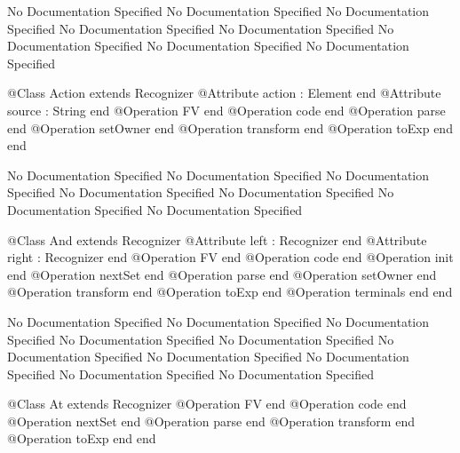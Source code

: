 No Documentation Specified
No Documentation Specified
No Documentation Specified
No Documentation Specified
No Documentation Specified
No Documentation Specified
No Documentation Specified
No Documentation Specified
\begin{Interface}
@Class Action extends Recognizer
  @Attribute action : Element end
  @Attribute source : String end
  @Operation FV end
  @Operation code end
  @Operation parse end
  @Operation setOwner end
  @Operation transform end
  @Operation toExp end
end
\end{Interface}
No Documentation Specified
No Documentation Specified
No Documentation Specified
No Documentation Specified
No Documentation Specified
No Documentation Specified
No Documentation Specified
\begin{Interface}
@Class And extends Recognizer
  @Attribute left : Recognizer end
  @Attribute right : Recognizer end
  @Operation FV end
  @Operation code end
  @Operation init end
  @Operation nextSet end
  @Operation parse end
  @Operation setOwner end
  @Operation transform end
  @Operation toExp end
  @Operation terminals end
end
\end{Interface}
No Documentation Specified
No Documentation Specified
No Documentation Specified
No Documentation Specified
No Documentation Specified
No Documentation Specified
No Documentation Specified
No Documentation Specified
No Documentation Specified
No Documentation Specified
\begin{Interface}
@Class At extends Recognizer
  @Operation FV end
  @Operation code end
  @Operation nextSet end
  @Operation parse end
  @Operation transform end
  @Operation toExp end
end
\end{Interface}
